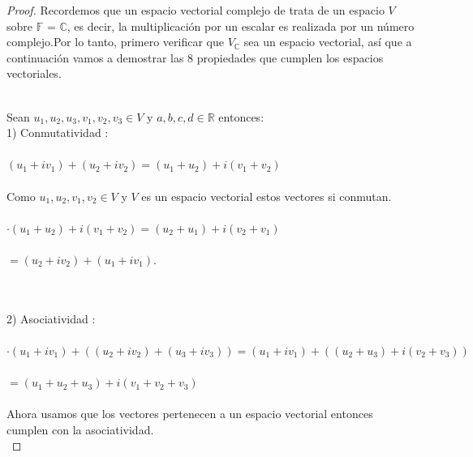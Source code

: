 \documentclass[11pt]{article}
\theoremstyle{definition} %
\begin{document}
\begin{proof}
  Recordemos que un espacio vectorial complejo de trata de un espacio $V$ sobre $\mathbb{F}$ = $\mathbb{C}$, es decir, la multiplicación por un escalar es realizada por un número complejo.Por lo tanto, primero verificar que $V_{\mathbb{C}}$ sea un espacio vectorial, así que a continuación vamos a demostrar las 8 propiedades que cumplen los espacios vectoriales.

\\

Sean $u_1, u_2, u_3, v_1, v_2, v_3  \in V$ y $a, b, c ,d \in \mathbb{R}$ entonces: \\



1) Conmutatividad :\\

\\

$(u_1 + iv_1) + (u_2 + iv_2) = (u_1 + u_2) + i(v_1 + v_2)$ \\

\\

Como $u_1, u_2, v_1, v_2 \in V$ y $V$ es un espacio vectorial estos vectores si conmutan. \\ 

\\

$\cdot (u_1 + u_2) + i(v_1 +v_2) = (u_2 + u_1) + i(v_2 + v_1)$ \\

 \\

$ = (u_2 + iv_2) + (u_1 + iv_1)$.

\\

\\

2) Asociatividad :\\

\\

$\cdot (u_1 + iv_1) + ((u_2 +iv_2) + (u_3 + iv_3)) = (u_1 + iv_1) + ((u_2 + u_3) + i(v_2 + v_3))$ \\

\\

$= (u_1 + u_2 + u_3) + i(v_1 + v_2 + v_3)$\\

\\

Ahora usamos que los vectores pertenecen a un espacio vectorial entonces cumplen con la asociatividad.\\


\end{proof}
\end{document}
